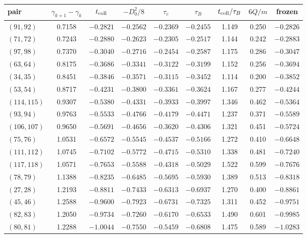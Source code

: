 \begin{table}[htbp]
\centering\footnotesize\setlength{\tabcolsep}{4pt}
\begin{tabular}{lcccccccc}
\toprule
pair & $\gamma_{k+1}-\gamma_k$ & $t_{\rm coll}$ & $-D_0^2/8$ & $\tau_c$ & $\tau_B$ & $t_{\rm coll}/\tau_B$ & $6Q/m$ & frozen\\
\midrule
$(91,92)$ & 0.7158 & $-0.2821$ & $-0.2562$ & $-0.2369$ & $-0.2455$ & 1.149 & 0.250 & $-0.2826$\\
$(71,72)$ & 0.7243 & $-0.2880$ & $-0.2623$ & $-0.2305$ & $-0.2517$ & 1.144 & 0.242 & $-0.2883$\\
$(97,98)$ & 0.7370 & $-0.3040$ & $-0.2716$ & $-0.2454$ & $-0.2587$ & 1.175 & 0.286 & $-0.3047$\\
$(63,64)$ & 0.8175 & $-0.3686$ & $-0.3341$ & $-0.3122$ & $-0.3199$ & 1.152 & 0.256 & $-0.3694$\\
$(34,35)$ & 0.8451 & $-0.3846$ & $-0.3571$ & $-0.3115$ & $-0.3452$ & 1.114 & 0.200 & $-0.3852$\\
$(53,54)$ & 0.8717 & $-0.4231$ & $-0.3800$ & $-0.3361$ & $-0.3624$ & 1.167 & 0.277 & $-0.4244$\\
$(114,115)$ & 0.9307 & $-0.5380$ & $-0.4331$ & $-0.3933$ & $-0.3997$ & 1.346 & 0.462 & $-0.5364$\\
$(93,94)$ & 0.9763 & $-0.5533$ & $-0.4766$ & $-0.4179$ & $-0.4471$ & 1.237 & 0.371 & $-0.5589$\\
$(106,107)$ & 0.9650 & $-0.5691$ & $-0.4656$ & $-0.3620$ & $-0.4306$ & 1.321 & 0.451 & $-0.5724$\\
$(75,76)$ & 1.0531 & $-0.6572$ & $-0.5545$ & $-0.4537$ & $-0.5166$ & 1.272 & 0.410 & $-0.6648$\\
$(111,112)$ & 1.0745 & $-0.7102$ & $-0.5772$ & $-0.4715$ & $-0.5310$ & 1.338 & 0.481 & $-0.7240$\\
$(117,118)$ & 1.0571 & $-0.7653$ & $-0.5588$ & $-0.4318$ & $-0.5029$ & 1.522 & 0.599 & $-0.7676$\\
$(78,79)$ & 1.1388 & $-0.8235$ & $-0.6485$ & $-0.5695$ & $-0.5930$ & 1.389 & 0.513 & $-0.8318$\\
$(27,28)$ & 1.2193 & $-0.8811$ & $-0.7433$ & $-0.6313$ & $-0.6937$ & 1.270 & 0.400 & $-0.8861$\\
$(45,46)$ & 1.2588 & $-0.9600$ & $-0.7923$ & $-0.6731$ & $-0.7325$ & 1.311 & 0.452 & $-0.9751$\\
$(82,83)$ & 1.2050 & $-0.9734$ & $-0.7260$ & $-0.6170$ & $-0.6533$ & 1.490 & 0.601 & $-0.9985$\\
$(80,81)$ & 1.2288 & $-1.0044$ & $-0.7550$ & $-0.5459$ & $-0.6808$ & 1.475 & 0.589 & $-1.0283$\\

\end{tabular}
\end{table}
